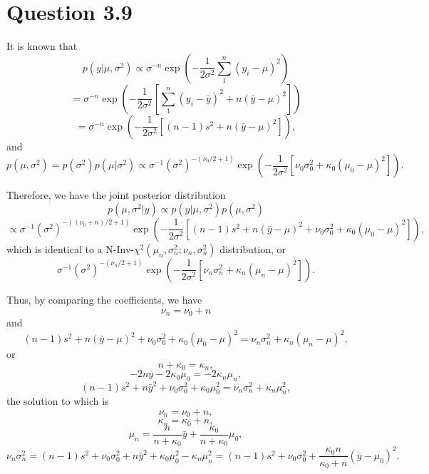 \documentclass{article}
\begin{document}
\section*{Question 3.9}
{
    It is known that
    $$p(y | \mu, \sigma^2) \propto \sigma^{-n} \exp{\left(-\frac{1}{2\sigma^2} \sum_1^n {(y_i-\mu)^2}\right)}$$
    $$= \sigma^{-n} \exp{\left(-\frac{1}{2\sigma^2} \left[\sum_1^n {(y_i-\bar{y})^2} + n (\bar{y}-\mu)^2 \right]\right)}$$
    $$= \sigma^{-n} \exp{\left(-\frac{1}{2\sigma^2} \left[(n-1)s^2 + n (\bar{y}-\mu)^2 \right]\right)},$$
    and
    $$p(\mu, \sigma^2) = p(\sigma^2) p(\mu | \sigma^2) \propto \sigma^{-1} (\sigma^2)^{-(\nu_0/2+1)} \exp{\left( -\frac{1}{2\sigma^2} \left[ \nu_0\sigma_0^2 + \kappa_0(\mu_0-\mu)^2 \right] \right)}.$$

    Therefore, we have the joint posterior distribution
    $$p(\mu, \sigma^2 | y) \propto p(y | \mu, \sigma^2) p(\mu, \sigma^2)$$
    $$\propto \sigma^{-1} (\sigma^2)^{-((\nu_0+n)/2+1)} \exp{\left( -\frac{1}{2\sigma^2} \left[ (n-1)s^2 + n (\bar{y}-\mu)^2 + \nu_0\sigma_0^2 + \kappa_0(\mu_0-\mu)^2 \right] \right)},$$ 
    which is identical to a N-Inv-$\chi^2 (\mu_n, \sigma_n^2; \nu_n, \sigma_n^2)$ distribution, or 
    $$\sigma^{-1} (\sigma^2)^{-(\nu_n/2+1)} \exp{\left( -\frac{1}{2\sigma^2} \left[ \nu_n\sigma_n^2 + \kappa_n(\mu_n-\mu)^2 \right] \right)}.$$

    Thus, by comparing the coefficients, we have $$\nu_n = \nu_0+n$$ and
    $$(n-1)s^2 + n (\bar{y}-\mu)^2 + \nu_0\sigma_0^2 + \kappa_0(\mu_0-\mu)^2 = \nu_n\sigma_n^2 + \kappa_n(\mu_n-\mu)^2,$$ or
    $$n+\kappa_0 = \kappa_n,$$
    $$-2n\bar{y} - 2\kappa_0 \mu_0 = -2\kappa_n \mu_n,$$
    $$(n-1)s^2 + n\bar{y}^2 + \nu_0\sigma_0^2 + \kappa_0 \mu_0^2 = \nu_n\sigma_n^2 + \kappa_n \mu_n^2,$$
    the solution to which is 
    $$\nu_n = \nu_0+n,$$
    $$\kappa_n = \kappa_0+n,$$
    $$\mu_n = \frac{n}{n+\kappa_0} \bar{y} + \frac{\kappa_0}{n+\kappa_0} \mu_0,$$
    $$\nu_n\sigma_n^2 = (n-1)s^2 + \nu_0\sigma_0^2 + n\bar{y}^2 + \kappa_0 \mu_0^2 - \kappa_n \mu_n^2 = (n-1)s^2 + \nu_0\sigma_0^2 + \frac{\kappa_0 n}{\kappa_0 + n} (\bar{y}-\mu_0)^2.$$

}
\end{document}

